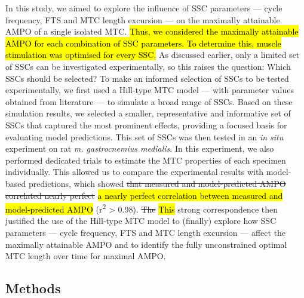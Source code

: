 \documentclass[
  10pt,
  letterpaper,
]{article}
\begin{document}
In this study, we aimed to explore the influence of SSC parameters ---
cycle frequency, FTS and MTC length excursion --- on the maximally
attainable AMPO of a single isolated MTC. \hl{Thus, we considered the
maximally attainable AMPO for each combination of SSC parameters. To
determine this, muscle stimulation was optimised for every SSC.} As
discussed earlier, only a limited set of SSCs can be investigated
experimentally, so this raises the question: Which SSCs should be
selected? To make an informed selection of SSCs to be tested
experimentally, we first used a Hill-type MTC model --- with parameter
values obtained from literature --- to simulate a broad range of SSCs.
Based on these simulation results, we selected a smaller, representative
and informative set of SSCs that captured the most prominent effects,
providing a focused basis for evaluating model predictions. This set of
SSCs was then tested in an \emph{in situ} experiment on rat \emph{m.
gastrocnemius medialis}. In this experiment, we also performed dedicated
trials to estimate the MTC properties of each specimen individually.
This allowed us to compare the experimental results with model-based
predictions, which showed \st{that measured and model-predicted AMPO
correlated nearly perfect} \hl{a nearly perfect correlation between
measured and model-predicted AMPO} (r\textsuperscript{2} \textgreater{}
0.98). \st{The} \hl{This} strong correspondence then justified the use
of the Hill-type MTC model to (finally) explore how SSC parameters ---
cycle frequency, FTS and MTC length excursion --- affect the maximally
attainable AMPO and to identify the fully unconstrained optimal MTC
length over time for maximal AMPO.

\subsection{Methods}\label{methods}
\end{document}
